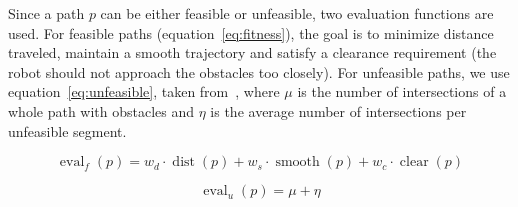 Since a path $p$ can be either feasible or unfeasible, two evaluation functions
are used. For feasible paths (equation~\ref{eq:fitness}), the goal is to minimize distance traveled,
maintain a smooth trajectory and satisfy a clearance requirement (the robot
should not approach the obstacles too closely). For unfeasible paths, we use
equation~\ref{eq:unfeasible}, taken from~\cite{Xiao97-2}, where $\mu$ is the number 
of intersections of a whole path with obstacles and $\eta$ is the average number
of intersections per unfeasible segment.

\begin{equation}
\label{eq:fitness}
\operatorname{eval}_f(p)=w_d\cdot \operatorname{dist}(p) + w_s\cdot \operatorname{smooth}(p)+w_c\cdot \operatorname{clear}(p)
\end{equation}

\begin{equation}
\label{eq:unfeasible}
\operatorname{eval}_u(p)= \mu + \eta
\end{equation}

